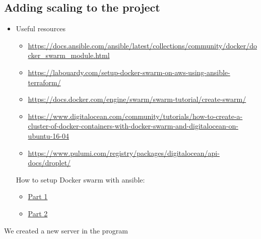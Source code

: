 \subsection{Adding scaling to the project}
\label{log:adding-scaling-to-the-project}

\begin{itemize}
    \item Useful resources
    \begin{itemize}
        \item \url{https://docs.ansible.com/ansible/latest/collections/community/docker/docker_swarm_module.html}
        \item \url{https://labouardy.com/setup-docker-swarm-on-aws-using-ansible-terraform/}
        \item \url{https://docs.docker.com/engine/swarm/swarm-tutorial/create-swarm/}
        \item \url{https://www.digitalocean.com/community/tutorials/how-to-create-a-cluster-of-docker-containers-with-docker-swarm-and-digitalocean-on-ubuntu-16-04}
        \item \url{https://www.pulumi.com/registry/packages/digitalocean/api-docs/droplet/}
    \end{itemize}

    How to setup Docker swarm with ansible:

    \begin{itemize}
        \item \href{https://www.youtube.com/watch?v=xZx9XoBnAUI}{Part 1}
        \item \href{https://www.youtube.com/watch?v=qVGO5_bKmpE\&list=PLWZKNB9waqIXEL-NIapWwIADPtkspe9vk\&index=47\&t=201s}{Part 2}
    \end{itemize}
\end{itemize}

We created a new server in the program

\begin{Shaded}
\begin{Highlighting}[]
\ExtensionTok{$}
\ExtensionTok{$}
\ErrorTok{(}\KeywordTok{)} 



\end{Highlighting}
\end{Shaded}

